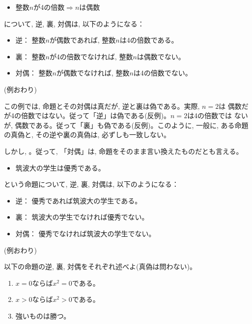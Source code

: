 \begin{exmpl}
\begin{itemize}
\item 整数$n$が4の倍数$\Longrightarrow n$は偶数
\end{itemize}
について, 逆, 裏, 対偶は, 以下のようになる：
\begin{itemize}
\item 逆： 整数$n$が偶数であれば, 整数$n$は4の倍数である。
\item 裏： 整数$n$が4の倍数でなければ, 整数$n$は偶数でない。
\item 対偶： 整数$n$が偶数でなければ, 整数$n$は4の倍数でない。
\end{itemize}
(例おわり)\end{exmpl}

この例では, 命題とその対偶は真だが, 逆と裏は偽である。実際, $n=2$は
偶数だが4の倍数ではない。従って「逆」は偽である(反例)。$n=2$は4の倍数では
ないが, 偶数である。従って「裏」も偽である(反例)。このように, 一般に, 
ある命題の真偽と, その逆や裏の真偽は, 必ずしも一致しない。

しかし, 。従って, 「対偶」は, 
命題をそのまま言い換えたものだとも言える。\\

\begin{exmpl}
\begin{itemize}
\item 筑波大の学生は優秀である。
\end{itemize}
という命題について, 逆, 裏, 対偶は, 以下のようになる：
\begin{itemize}
\item 逆： 優秀であれば筑波大の学生である。
\item 裏： 筑波大の学生でなければ優秀でない。
\item 対偶： 優秀でなければ筑波大の学生でない。
\end{itemize}
(例おわり)\end{exmpl}
\mv


\begin{q}\label{q:logic_gyaku0} 以下の命題の逆, 裏, 対偶をそれぞれ述べよ(真偽は問わない)。
\begin{enumerate}
\item $x=0$ならば$x^2=0$である。
\item $x>0$ならば$x^2>0$である。
\item 強いものは勝つ。
\end{enumerate}
\end{q}
\mv


